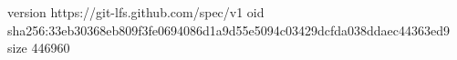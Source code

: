 version https://git-lfs.github.com/spec/v1
oid sha256:33eb30368eb809f3fe0694086d1a9d55e5094c03429dcfda038ddaec44363ed9
size 446960
